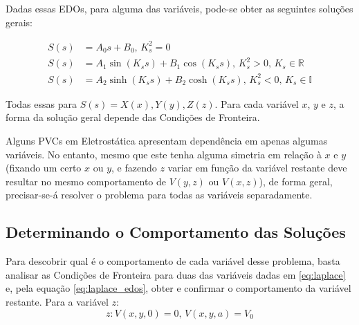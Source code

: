 \documentclass{report}
\begin{document}
Dadas essas EDOs, para alguma das variáveis, pode-se obter as seguintes soluções gerais:

\vspace*{-1.5\baselineskip}
\begin{center}
  \begin{align}
    \label{eq:laplace_solutions_degenerates}
    S(s) &= A_0s + B_0,\, K_s^2 = 0 \\
    \label{eq:laplace_solutions_real}
    S(s) &= A_1\sin(K_ss) + B_1\cos(K_ss),\, K_s^2 > 0,\, K_s \in \mathbb{R} \\
    \label{eq:laplace_solutions_imaginary}
    S(s) &= A_2\sinh(K_ss) + B_2\cosh(K_ss),\, K_s^2 < 0,\, K_s \in \mathbb{I}
  \end{align}
\end{center}

Todas essas para $ S(s) = X(x), Y(y), Z(z) $. Para cada variável $ x $, $ y $ e $ z $, a
forma da solução geral depende das Condições de Fronteira.

Alguns PVCs em Eletrostática apresentam dependência em apenas algumas variáveis. No entanto,
mesmo que este tenha alguma simetria em relação à $ x $ e $ y $ (fixando um certo $ x $ ou $ y $,
e fazendo $ z $ variar em função da variável restante deve resultar no mesmo comportamento de $ V(y,z) $
ou $ V(x,z) $), de forma geral, precisar-se-á resolver o problema para todas as variáveis separadamente.

\subsection{Determinando o Comportamento das Soluções}

Para descobrir qual é o comportamento de cada variável desse problema, basta analisar as Condições de Fronteira
para duas das variáveis dadas em \ref{eq:laplace} e, pela equação \ref{eq:laplace_edos}, obter e confirmar o
comportamento da variável restante.
Para a variável $ z $:
$$ z: V(x, y, 0) = 0,\, V(x, y, a) = V_0 $$
\end{document}
